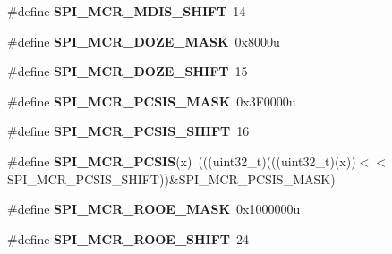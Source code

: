 \begin{DoxyCompactItemize}
\item 
\#define {\bfseries S\+P\+I\+\_\+\+M\+C\+R\+\_\+\+M\+D\+I\+S\+\_\+\+S\+H\+I\+FT}~14\hypertarget{group__SPI__Register__Masks_gad71aeecbfd5ab69825143fb055ae3e2b}{}\label{group__SPI__Register__Masks_gad71aeecbfd5ab69825143fb055ae3e2b}

\item 
\#define {\bfseries S\+P\+I\+\_\+\+M\+C\+R\+\_\+\+D\+O\+Z\+E\+\_\+\+M\+A\+SK}~0x8000u\hypertarget{group__SPI__Register__Masks_ga1f301c07deb8544d117e752400e0e537}{}\label{group__SPI__Register__Masks_ga1f301c07deb8544d117e752400e0e537}

\item 
\#define {\bfseries S\+P\+I\+\_\+\+M\+C\+R\+\_\+\+D\+O\+Z\+E\+\_\+\+S\+H\+I\+FT}~15\hypertarget{group__SPI__Register__Masks_gab24077f2090f26468c4ebe2ecfda7c5f}{}\label{group__SPI__Register__Masks_gab24077f2090f26468c4ebe2ecfda7c5f}

\item 
\#define {\bfseries S\+P\+I\+\_\+\+M\+C\+R\+\_\+\+P\+C\+S\+I\+S\+\_\+\+M\+A\+SK}~0x3\+F0000u\hypertarget{group__SPI__Register__Masks_ga69de8a51e829efc59b2a2402a8210aeb}{}\label{group__SPI__Register__Masks_ga69de8a51e829efc59b2a2402a8210aeb}

\item 
\#define {\bfseries S\+P\+I\+\_\+\+M\+C\+R\+\_\+\+P\+C\+S\+I\+S\+\_\+\+S\+H\+I\+FT}~16\hypertarget{group__SPI__Register__Masks_ga5130ba4524baa3be71b17af17b06b3e2}{}\label{group__SPI__Register__Masks_ga5130ba4524baa3be71b17af17b06b3e2}

\item 
\#define {\bfseries S\+P\+I\+\_\+\+M\+C\+R\+\_\+\+P\+C\+S\+IS}(x)~(((uint32\+\_\+t)(((uint32\+\_\+t)(x))$<$$<$S\+P\+I\+\_\+\+M\+C\+R\+\_\+\+P\+C\+S\+I\+S\+\_\+\+S\+H\+I\+FT))\&S\+P\+I\+\_\+\+M\+C\+R\+\_\+\+P\+C\+S\+I\+S\+\_\+\+M\+A\+SK)\hypertarget{group__SPI__Register__Masks_ga81637c9ef8f34bdb499086de99c99858}{}\label{group__SPI__Register__Masks_ga81637c9ef8f34bdb499086de99c99858}

\item 
\#define {\bfseries S\+P\+I\+\_\+\+M\+C\+R\+\_\+\+R\+O\+O\+E\+\_\+\+M\+A\+SK}~0x1000000u\hypertarget{group__SPI__Register__Masks_ga2f3c41dcffc0058ae83ae7b1dbfffd86}{}\label{group__SPI__Register__Masks_ga2f3c41dcffc0058ae83ae7b1dbfffd86}

\item 
\#define {\bfseries S\+P\+I\+\_\+\+M\+C\+R\+\_\+\+R\+O\+O\+E\+\_\+\+S\+H\+I\+FT}~24\hypertarget{group__SPI__Register__Masks_ga78f4dfaad41aae2ee10979f2e248e4d3}{}\label{group__SPI__Register__Masks_ga78f4dfaad41aae2ee10979f2e248e4d3}


\end{DoxyCompactItemize}
